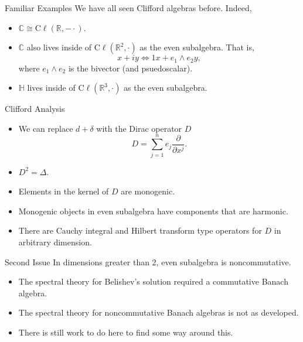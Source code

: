 \documentclass[aspectratio=169]{beamer}
\newcommand{\R}{\mathbb{R}}
\newcommand{\C}{\mathbb{C}}
\newcommand{\clifford}{\mathrm{C}\ell}
\begin{document}
\begin{frame}{Familiar Examples}
\vfill
\pause
We have all seen Clifford algebras before.  Indeed, 
\pause
\begin{itemize}
    \item $\C \cong \clifford(\R,-\cdot)$.
    
    \pause
    \item $\C$ also lives inside of $\clifford(\R^2,\cdot)$ as the even subalgebra. That is,
    \[
    x+iy \iff 1x + e_1 \wedge e_2 y,
    \]
    where $e_1\wedge e_2$ is the bivector (and psuedoscalar).  
    \pause
    \item $\mathbb{H}$ lives inside of $\clifford(\R^3,\cdot)$ as the even subalgebra.
\end{itemize}
\vfill
\end{frame} 

\begin{frame}{Clifford Analysis}
\vfill
\begin{itemize}
\pause

    \item We can replace $d+\delta$ with the Dirac operator $D$
    \[
    D = \sum_{j=1}^n e_j \frac{\partial}{\partial x^j}.
    \]
    
    \pause
    \item $D^2 = \Delta$.
    
    \pause
    \item Elements in the kernel of $D$ are monogenic.
    
    \pause
    \item Monogenic objects in even subalgebra have components that are harmonic.
    
    \pause
    \item There are Cauchy integral and Hilbert transform type operators for $D$ in arbitrary dimension.
    \end{itemize}
    \vfill
\end{frame}

\begin{frame}{Second Issue}
    In dimensions greater than 2, even subalgebra is noncommutative.
    \begin{itemize}
        \pause
        \item The spectral theory for Belishev's solution required a commutative Banach algebra.
        
        \pause
        \item The spectral theory for noncommutative Banach algebras is not as developed.
        
        \pause
        \item There is still work to do here to find some way around this.
    \end{itemize}
\end{frame}
\end{document}
